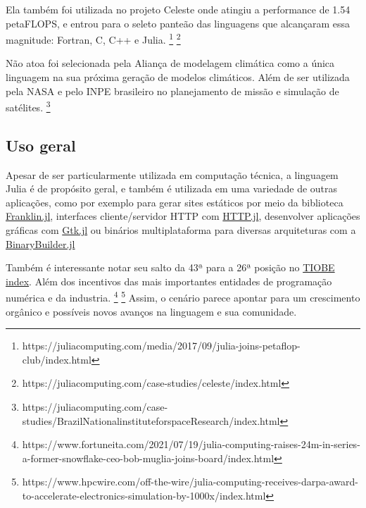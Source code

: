 Ela também foi utilizada no projeto Celeste onde atingiu a performance de 1.54 petaFLOPS, e entrou para o seleto panteão das linguagens que alcançaram essa magnitude: Fortran, C, C++ e Julia. \cite{Prabhat2017} \footnote{https://juliacomputing.com/media/2017/09/julia-joins-petaflop-club/index.html} \footnote{https://juliacomputing.com/case-studies/celeste/index.html}

Não atoa foi selecionada pela Aliança de modelagem climática como a única linguagem na sua próxima geração de modelos climáticos. Além de ser utilizada pela NASA e pelo INPE brasileiro no planejamento de missão e simulação de satélites. \cite{JC_INPE} \footnote{https://juliacomputing.com/case-studies/BrazilNationalinstituteforspaceResearch/index.html}



\subsection{Uso geral}

Apesar de ser particularmente utilizada em computação técnica, a linguagem Julia é de propósito geral, e também é utilizada em uma variedade de outras aplicações, como por exemplo para gerar sites estáticos por meio da biblioteca \href{http://franklinjl.org/index.html)}{Franklin.jl}, interfaces cliente/servidor HTTP com \href{https://github.com/JuliaWeb/HTTP.jl}{HTTP.jl}, desenvolver aplicações gráficas com \href{https://github.com/JuliaGraphics/Gtk.jl}{Gtk.jl} ou binários multiplataforma para diversas arquiteturas com a \href{http://binarybuilder.org/}{BinaryBuilder.jl}

Também é interessante notar seu salto da 43ª para a 26ª posição no \href{https://www.tiobe.com/tiobe-index/}{TIOBE index}. 
Além dos incentivos das mais importantes entidades de programação numérica e da industria. \footnote{https://www.fortuneita.com/2021/07/19/julia-computing-raises-24m-in-series-a-former-snowflake-ceo-bob-muglia-joins-board/index.html} \footnote{https://www.hpcwire.com/off-the-wire/julia-computing-receives-darpa-award-to-accelerate-electronics-simulation-by-1000x/index.html}
Assim, o cenário parece apontar para um crescimento orgânico e possíveis novos avanços na linguagem e sua comunidade. 




